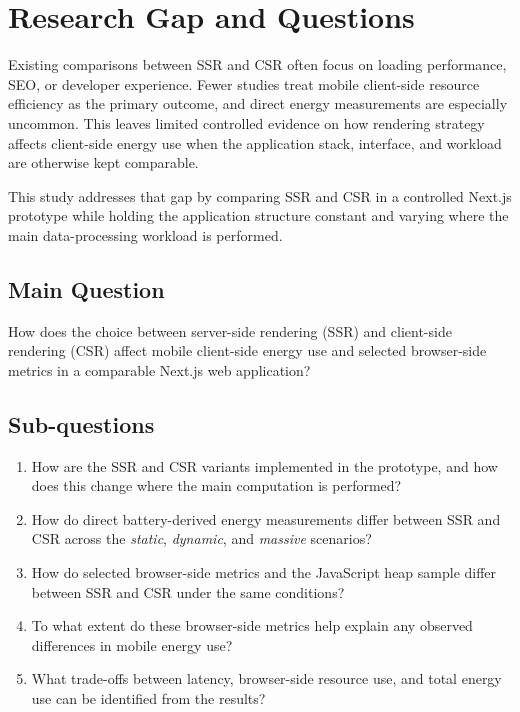 \section{Research Gap and Questions}

Existing comparisons between SSR and CSR often focus on loading performance, SEO, or developer experience. Fewer studies treat mobile client-side resource efficiency as the primary outcome, and direct energy measurements are especially uncommon. This leaves limited controlled evidence on how rendering strategy affects client-side energy use when the application stack, interface, and workload are otherwise kept comparable.

This study addresses that gap by comparing SSR and CSR in a controlled Next.js prototype while holding the application structure constant and varying where the main data-processing workload is performed.

\subsection{Main Question}

How does the choice between server-side rendering (SSR) and client-side rendering (CSR) affect mobile client-side energy use and selected browser-side metrics in a comparable Next.js web application?

\subsection{Sub-questions}

\begin{enumerate}
	\item How are the SSR and CSR variants implemented in the prototype, and how does this change where the main computation is performed?
	\item How do direct battery-derived energy measurements differ between SSR and CSR across the \textit{static}, \textit{dynamic}, and \textit{massive} scenarios?
	\item How do selected browser-side metrics and the JavaScript heap sample differ between SSR and CSR under the same conditions?
	\item To what extent do these browser-side metrics help explain any observed differences in mobile energy use?
	\item What trade-offs between latency, browser-side resource use, and total energy use can be identified from the results?
\end{enumerate}

